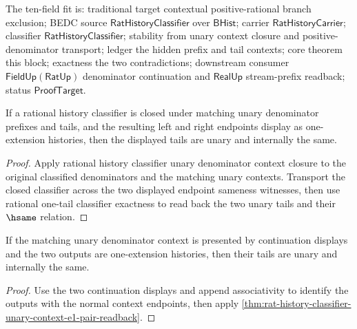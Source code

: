 The ten-field fit is: traditional target contextual positive-rational branch
exclusion; BEDC source $\mathsf{RatHistoryClassifier}$ over $\mathsf{BHist}$;
carrier $\mathsf{RatHistoryCarrier}$; classifier
$\mathsf{RatHistoryClassifier}$; stability from unary context closure and
positive-denominator transport; ledger the hidden prefix and tail contexts;
core theorem this block; exactness the two contradictions; downstream consumer
$\mathsf{FieldUp}(\mathsf{RatUp})$ denominator continuation and
$\mathsf{RealUp}$ stream-prefix readback; status $\mathsf{ProofTarget}$.

\begin{theorem}
\label{thm:rat-history-classifier-unary-context-e1-pair-readback}
If a rational history classifier is closed under matching unary denominator prefixes and tails, and the resulting left and right endpoints display as one-extension histories, then the displayed tails are unary and internally the same.
\end{theorem}
\begin{proof}
Apply rational history classifier unary denominator context closure to the original classified denominators and the matching unary contexts. Transport the closed classifier across the two displayed endpoint sameness witnesses, then use rational one-tail classifier exactness to read back the two unary tails and their $\hsame$ relation.
\end{proof}

\begin{theorem}
\label{thm:rat-history-classifier-cont-unary-context-e1-pair-readback}
If the matching unary denominator context is presented by continuation
displays and the two outputs are one-extension histories, then their tails are
unary and internally the same.
\end{theorem}
\begin{proof}
Use the two continuation displays and append associativity to identify the
outputs with the normal context endpoints, then apply
\autoref{thm:rat-history-classifier-unary-context-e1-pair-readback}.
\end{proof}

